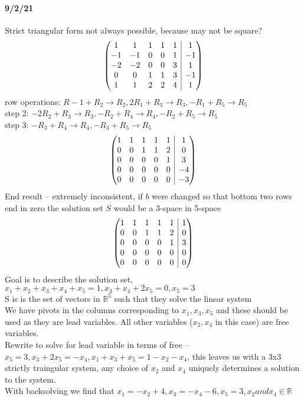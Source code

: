 \documentclass{article}
\makeatletter
\newenvironment{amatrix}[1]{%
  \left(\begin{array}{@{}*{#1}{c}|c@{}}
}{%
  \end{array}\right)
}
\makeatother
\begin{document}
\paragraph{9/2/21}
Strict triangular form not always possible, because may not be square? \\
\[\begin{amatrix}{5}
    1&1&1&1&1&1\\
    -1&-1&0&0&1&-1\\
    -2&-2&0&0&3&1\\
    0&0&1&1&3&-1\\
    1&1&2&2&4&1
\end{amatrix}\]
row operations: $R-1+R_2 \rightarrow R_2, 2R_1+R_3\rightarrow R_3, -R_1+R_5 \rightarrow R_5$ \\
step 2: $-2R_2+R_3\rightarrow R_3, -R_2 +R_4 \rightarrow R_4, -R_2+R_5 \rightarrow R_5$ \\
step 3: $-R_3+R_4 \rightarrow R_4, -R_3 +R_5 \rightarrow R_5$ \\
\[\begin{amatrix}{5}
    1&1&1&1&1&1\\
    0&0&1&1&2&0\\
    0&0&0&0&1&3\\
    0&0&0&0&0&-4\\
    0&0&0&0&0&-3
\end{amatrix}\]
End result -- extremely inconsistent, if $b$ were changed so that bottom two rows end in zero the solution set $S$
would be a 3-space in 5-space \\
\[\begin{amatrix}{5}
    1&1&1&1&1&1\\
    0&0&1&1&2&0\\
    0&0&0&0&1&3\\
    0&0&0&0&0&0\\
    0&0&0&0&0&0
\end{amatrix}\]
Goal is to describe the solution set,
$x_1+x_2+x_3+x_4+x_5=1, x_3+x_4+2x_5=0, x_5=3$ \\
S is is the set of vectors in $\mathbb{R}^5$ such that they solve the linear system \\
We have pivots in the columns corresponding to $x_1,x_3,x_5$ and these should be used as they are lead variables.
All other variables ($x_2,x_4$ in this case) are free variables. \\
Rewrite to solve for lead variable in terms of free --
$x_5=3, x_3+2x_5=-x_4, x_1+x_3+x_5=1-x_2-x_4$,
this leaves us with a 3x3 strictly traingular system, any choice of $x_2$ and $x_4$
uniquely determines a solution to the system. \\
With backsolving we find that $x_1=-x_2+4, x_3=-x_4-6,x_5=3, x_2 and x_4 \in \mathbb{R}$\\
\end{document}

